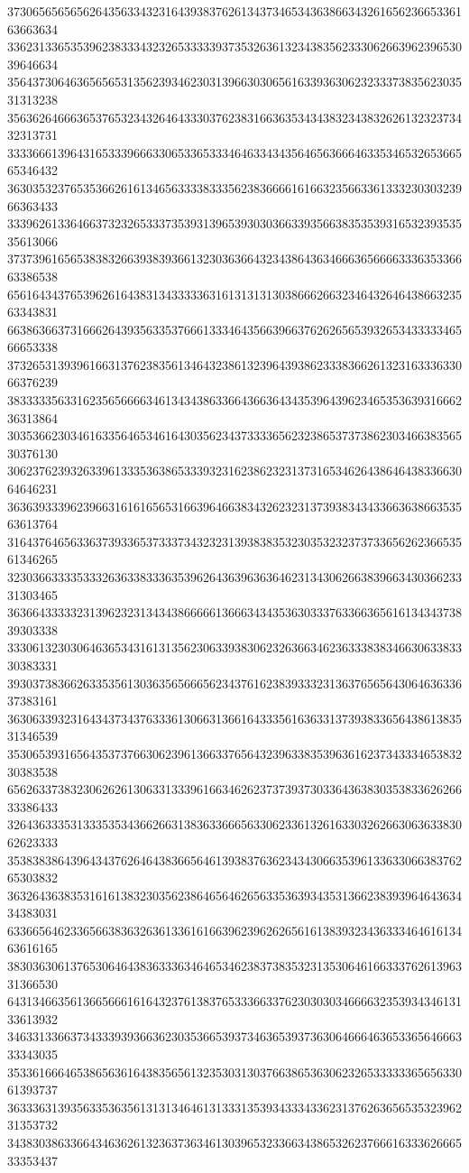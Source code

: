 37306565656562643563343231643938376261343734653436386634326165623665336163663634
33623133653539623833343232653333393735326361323438356233306266396239653039646634
35643730646365656531356239346230313966303065616339363062323337383562303531313238
35636264666365376532343264643330376238316636353434383234383262613232373432313731
33336661396431653339666330653365333464633434356465636664633534653265366565346432
36303532376535366261613465633338333562383666616166323566336133323030323966363433
33396261336466373232653337353931396539303036633935663835353931653239353535613066
37373961656538383266393839366132303636643234386436346663656666333635336663386538
65616434376539626164383134333336316131313130386662663234643264643866323563343831
66386366373166626439356335376661333464356639663762626565393265343333346566653338
37326531393961663137623835613464323861323964393862333836626132316333633066376239
38333335633162356566663461343438633664366364343539643962346535363931666236313864
30353662303461633564653461643035623437333365623238653737386230346638356530376130
30623762393263396133353638653339323162386232313731653462643864643833663064646231
36363933396239663161616565316639646638343262323137393834343366363866353563613764
31643764656336373933653733373432323139383835323035323237373365626236653561346265
32303663333533326363383336353962643639636364623134306266383966343036623331303465
36366433333231396232313434386666613666343435363033376336636561613434373839303338
33306132303064636534316131356230633938306232636634623633383834663063383330383331
39303738366263353561303635656665623437616238393332313637656564306463633637383161
36306339323164343734376333613066313661643335616363313739383365643861383531346539
35306539316564353737663062396136633765643239633835396361623734333465383230383538
65626337383230626261306331333961663462623737393730336436383035383362626633386433
32643633353133353534366266313836336665633062336132616330326266306363383062623333
35383838643964343762646438366564613938376362343430663539613363306638376265303832
36326436383531616138323035623864656462656335363934353136623839396464363434383031
63366564623365663836326361336161663962396262656161383932343633346461613463616165
38303630613765306464383633363464653462383738353231353064616633376261396331366530
64313466356136656661616432376138376533366337623030303466663235393434613133613932
34633133663734333939366362303536653937346365393736306466646365336564666333343035
35336166646538656361643835656132353031303766386536306232653333336565633061393737
36333631393563353635613131346461313331353934333433623137626365653532396231353732
34383038633664346362613236373634613039653233663438653262376661633362666533353437
